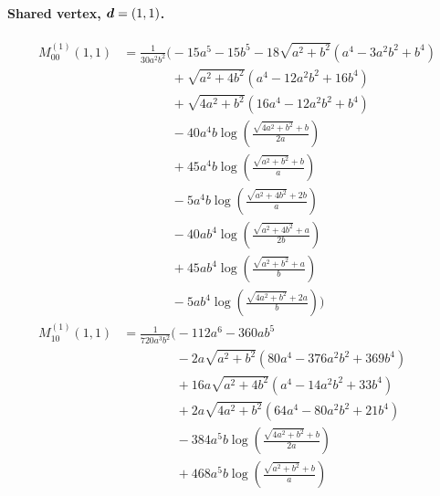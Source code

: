 \paragraph{Shared vertex, $\vb*{d}=(1,1)$.}
\begin{align*}
M^{(1)}_{00}(1,1) &= \frac{1}{30 a^{2} b^{2}}\Bigg(- 15 a^{5} - 15 b^{5} - 18 \sqrt{a^{2} + b^{2}}\left(a^{4} - 3 a^{2} b^{2} + b^{4}\right)\\
&\phantom{{}=\frac{1}{30 a^{2} b^{2}}\Bigg(}+ \sqrt{a^{2} + 4 b^{2}}\left(a^{4} - 12 a^{2} b^{2} + 16 b^{4}\right)\\
&\phantom{{}=\frac{1}{30 a^{2} b^{2}}\Bigg(}+ \sqrt{4 a^{2} + b^{2}}\left(16 a^{4} - 12 a^{2} b^{2} + b^{4}\right)\\
&\phantom{{}=\frac{1}{30 a^{2} b^{2}}\Bigg(}- 40 a^{4} b \log\left(\frac{\sqrt{4 a^{2} + b^{2}} + b}{2 a}\right)\\
&\phantom{{}=\frac{1}{30 a^{2} b^{2}}\Bigg(}+ 45 a^{4} b \log\left(\frac{\sqrt{a^{2} + b^{2}} + b}{a}\right)\\
&\phantom{{}=\frac{1}{30 a^{2} b^{2}}\Bigg(}- 5 a^{4} b \log\left(\frac{\sqrt{a^{2} + 4 b^{2}} + 2 b}{a}\right)\\
&\phantom{{}=\frac{1}{30 a^{2} b^{2}}\Bigg(}- 40 a b^{4} \log\left(\frac{\sqrt{a^{2} + 4 b^{2}} + a}{2 b}\right)\\
&\phantom{{}=\frac{1}{30 a^{2} b^{2}}\Bigg(}+ 45 a b^{4} \log\left(\frac{\sqrt{a^{2} + b^{2}} + a}{b}\right)\\
&\phantom{{}=\frac{1}{30 a^{2} b^{2}}\Bigg(}- 5 a b^{4} \log\left(\frac{\sqrt{4 a^{2} + b^{2}} + 2 a}{b}\right)\Bigg)\\[1.2ex]
M^{(1)}_{10}(1,1) &= \frac{1}{720 a^{3} b^{2}}\Bigg(- 112 a^{6} - 360 a b^{5}\\
&\phantom{{}=\frac{1}{720 a^{3} b^{2}}\Bigg(}- 2 a \sqrt{a^{2} + b^{2}}\left(80 a^{4} - 376 a^{2} b^{2} + 369 b^{4}\right)\\
&\phantom{{}=\frac{1}{720 a^{3} b^{2}}\Bigg(}+ 16 a \sqrt{a^{2} + 4 b^{2}}\left(a^{4} - 14 a^{2} b^{2} + 33 b^{4}\right)\\
&\phantom{{}=\frac{1}{720 a^{3} b^{2}}\Bigg(}+ 2 a \sqrt{4 a^{2} + b^{2}}\left(64 a^{4} - 80 a^{2} b^{2} + 21 b^{4}\right)\\
&\phantom{{}=\frac{1}{720 a^{3} b^{2}}\Bigg(}- 384 a^{5} b \log\left(\frac{\sqrt{4 a^{2} + b^{2}} + b}{2 a}\right)\\
&\phantom{{}=\frac{1}{720 a^{3} b^{2}}\Bigg(}+ 468 a^{5} b \log\left(\frac{\sqrt{a^{2} + b^{2}} + b}{a}\right)\\

\end{align*}
